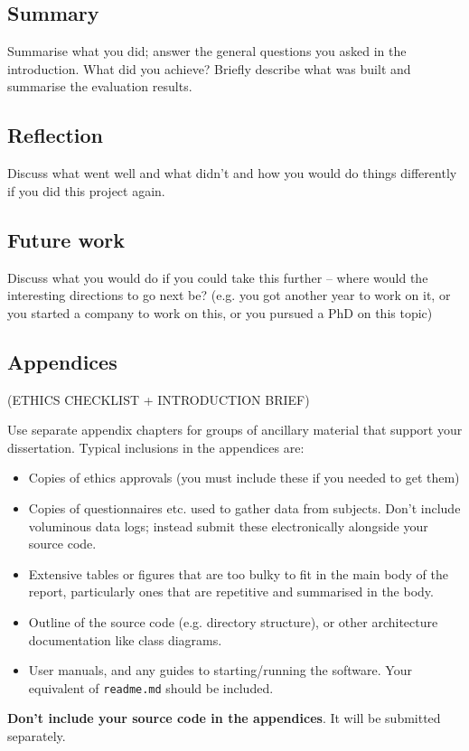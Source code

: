 \documentclass{l4proj}
\begin{document}
\section{Summary}
Summarise what you did; answer the general questions you asked in the introduction. What did you achieve? Briefly describe what was built and summarise the evaluation results.

\section{Reflection}
Discuss what went well and what didn't and how you would do things differently if you did this project again.

\section{Future work}
Discuss what you would do if you could take this further -- where would the interesting directions to go next be? (e.g. you got another year to work on it, or you started a company to work on this, or you pursued a PhD on this topic)

%
% 

\begin{appendices}

\chapter{Appendices}
 (ETHICS CHECKLIST + INTRODUCTION BRIEF)
 
Use separate appendix chapters for groups of ancillary material that support your dissertation. 
Typical inclusions in the appendices are:

\begin{itemize}
\item
  Copies of ethics approvals (you must include these if you needed to get them)
\item
  Copies of questionnaires etc. used to gather data from subjects. Don't include
  voluminous data logs; instead submit these electronically alongside your source code.
\item
  Extensive tables or figures that are too bulky to fit in the main body of
  the report, particularly ones that are repetitive and summarised in the body.
\item Outline of the source code (e.g. directory structure), 
    or other architecture documentation like class diagrams.
\item User manuals, and any guides to starting/running the software. 
Your equivalent of \texttt{readme.md} should be included.

\end{itemize}

\textbf{Don't include your source code in the appendices}. It will be
submitted separately.



\end{appendices}
\end{document}
